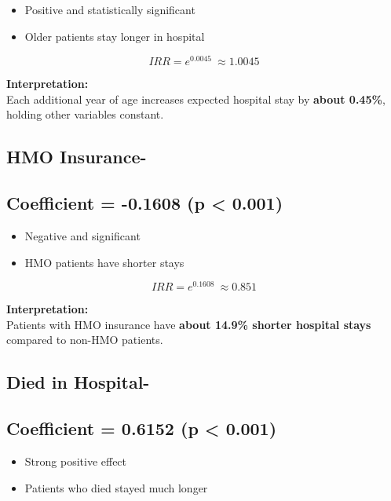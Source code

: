 \documentclass[
]{article}
\begin{document}
\begin{itemize}
\item
  Positive and statistically significant
\item
  Older patients stay longer in hospital
\end{itemize}

\[IRR = e^{0.0045}\  \approx 1.0045\]

\textbf{Interpretation:}\\
Each additional year of age increases expected hospital stay by
\textbf{about 0.45\%}, holding other variables constant.

\subsection{\texorpdfstring{\textbf{HMO
Insurance-}}{HMO Insurance-}}\label{hmo-insurance-}

\subsection{Coefficient = -0.1608 (p \textless{}
0.001)}\label{coefficient--0.1608-p-0.001}

\begin{itemize}
\item
  Negative and significant
\item
  HMO patients have shorter stays
\end{itemize}

\[IRR = e^{0.1608}\  \approx 0.851\]

\textbf{Interpretation:}\\
Patients with HMO insurance have \textbf{about 14.9\% shorter hospital
stays} compared to non-HMO patients.

\subsection{\texorpdfstring{ \textbf{Died in
Hospital-}}{ Died in Hospital-}}\label{died-in-hospital-}

\subsection{Coefficient = 0.6152 (p \textless{}
0.001)}\label{coefficient-0.6152-p-0.001}

\begin{itemize}
\item
  Strong positive effect
\item
  Patients who died stayed much longer
\end{itemize}
\end{document}
